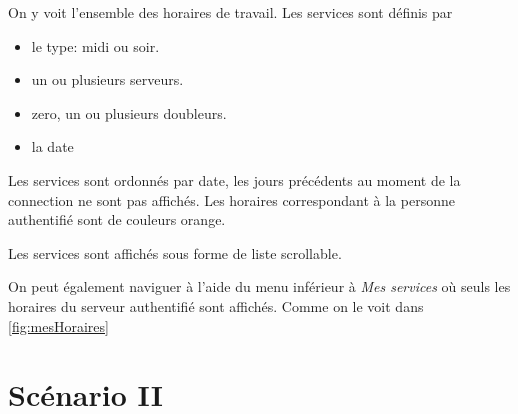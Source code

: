 On y voit l'ensemble des horaires de travail. Les services sont définis par
\begin{itemize}
    \item le type: midi ou soir.
    \item un ou plusieurs serveurs.
    \item zero, un ou plusieurs doubleurs.
    \item la date
\end{itemize}
Les services sont ordonnés par date, les jours précédents au moment de la connection ne 
sont pas affichés. Les horaires correspondant à la personne authentifié sont de couleurs orange.

Les services sont affichés sous forme de liste scrollable.

On peut également naviguer à l'aide du menu inférieur à \textit{Mes services} où seuls les horaires du serveur authentifié sont affichés. Comme on le voit 
dans \ref{fig:mesHoraires}

\section[Mise en bourse d'un service - Scénario II]{Scénario II}

